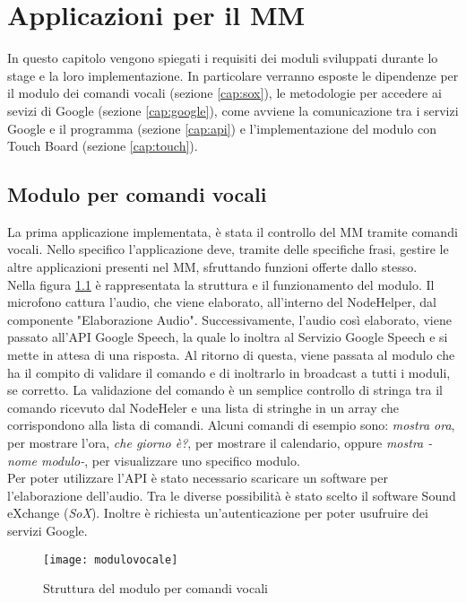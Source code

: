 \chapter{Applicazioni per il MM}\label{capitolo4}
In questo capitolo vengono spiegati i requisiti dei moduli sviluppati durante lo stage e la loro implementazione.
In particolare verranno esposte le dipendenze per il modulo dei comandi vocali (sezione \ref{cap:sox}), le metodologie
per accedere ai sevizi di Google (sezione \ref{cap:google}), come avviene la comunicazione tra i servizi Google e il programma (sezione \ref{cap:api})
e l'implementazione del modulo con Touch Board (sezione \ref{cap:touch}).

\section{Modulo per comandi vocali}\label{cap:voce}
La prima applicazione implementata, \`e
stata il controllo del MM tramite comandi vocali.
Nello specifico l'applicazione deve, tramite delle specifiche frasi,
gestire le altre applicazioni presenti nel MM, sfruttando funzioni offerte dallo stesso.\\
Nella figura \ref{fig:modulovocale} \`e rappresentata la struttura e il funzionamento del modulo.
Il microfono cattura l'audio, che viene elaborato, all'interno del NodeHelper, dal componente "Elaborazione Audio".
Successivamente, l'audio cos\`i elaborato, viene
passato all'API Google Speech, la quale lo inoltra al Servizio Google Speech e si mette in attesa di una risposta.
Al ritorno di questa, viene passata al modulo che ha il compito di validare il comando e di inoltrarlo in broadcast a tutti i moduli, se
corretto.
La validazione del comando è un semplice controllo di stringa tra il comando ricevuto dal NodeHeler e una lista di stringhe in un array che
corrispondono alla lista di comandi.
Alcuni comandi di esempio sono: \emph{mostra ora}, per mostrare l'ora, \emph{che giorno \`e?}, per mostrare
il calendario, oppure \emph{mostra -nome modulo-}, per visualizzare uno specifico modulo.\\
Per poter utilizzare l'API \`e stato necessario scaricare un software per l'elaborazione dell'audio.
Tra le diverse possibilit\`a è stato scelto il software Sound eXchange (\emph{SoX}).
Inoltre \`e richiesta un'autenticazione per poter usufruire dei servizi Google.

\begin{figure}[H]
    \texttt{[image: modulovocale]}
    \caption{Struttura del modulo per comandi vocali}
    \label{fig:modulovocale}
\end{figure}

